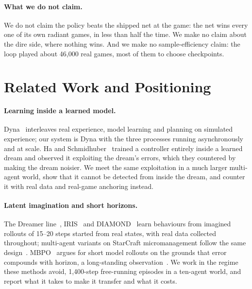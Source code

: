 \documentclass[11pt]{article}
\begin{document}
\paragraph{What we do not claim.} We do not claim the policy beats the shipped net at the game: the net wins every one of its own radiant games, in less than half the time. We make no claim about the dire side, where nothing wins. And we make no sample-efficiency claim: the loop played about 46,000 real games, most of them to choose checkpoints.

\section{Related Work and Positioning}
\label{sec:related}

\paragraph{Learning inside a learned model.} Dyna~\cite{sutton1991dyna} interleaves real experience, model learning and planning on simulated experience; our system is Dyna with the three processes running asynchronously and at scale. Ha and Schmidhuber~\cite{ha2018worldmodels} trained a controller entirely inside a learned dream and observed it exploiting the dream's errors, which they countered by making the dream noisier. We meet the same exploitation in a much larger multi-agent world, show that it cannot be detected from inside the dream, and counter it with real data and real-game anchoring instead.

\paragraph{Latent imagination and short horizons.} The Dreamer line~\cite{hafner2020dreamer,hafner2025dreamerv3}, IRIS~\cite{micheli2023iris} and DIAMOND~\cite{alonso2024diamond} learn behaviours from imagined rollouts of 15--20 steps started from real states, with real data collected throughout; multi-agent variants on StarCraft micromanagement follow the same design~\cite{egorov2022mamba}. MBPO~\cite{janner2019mbpo} argues for short model rollouts on the grounds that error compounds with horizon, a long-standing observation~\cite{talvitie2017self}. We work in the regime these methods avoid, 1,400-step free-running episodes in a ten-agent world, and report what it takes to make it transfer and what it costs.
\end{document}
